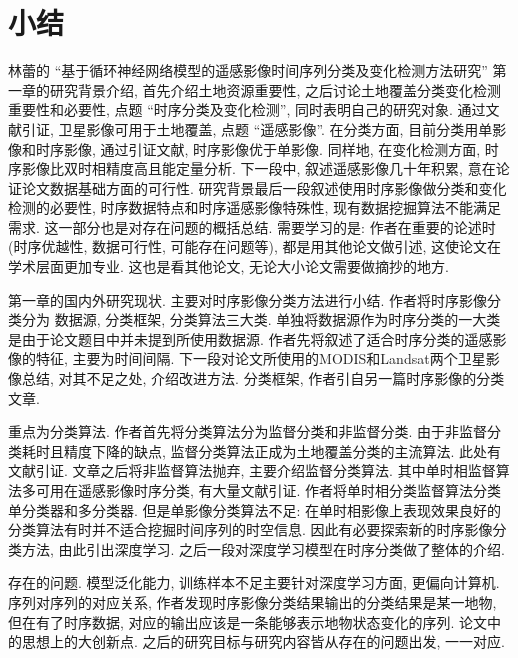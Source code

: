 \section{小结}
林蕾的 ``基于循环神经网络模型的遥感影像时间序列分类及变化检测方法研究'' 第一章的研究背景介绍, 首先介绍土地资源重要性, 之后讨论土地覆盖分类变化检测重要性和必要性, 点题 ``时序分类及变化检测'', 同时表明自己的研究对象. 通过文献引证, 卫星影像可用于土地覆盖, 点题 ``遥感影像''. 在分类方面, 目前分类用单影像和时序影像, 通过引证文献, 时序影像优于单影像. 同样地, 在变化检测方面, 时序影像比双时相精度高且能定量分析. 下一段中, 叙述遥感影像几十年积累, 意在论证论文数据基础方面的可行性. 研究背景最后一段叙述使用时序影像做分类和变化检测的必要性, 时序数据特点和时序遥感影像特殊性, 现有数据挖掘算法不能满足需求. 这一部分也是对存在问题的概括总结. 需要学习的是: 作者在重要的论述时(时序优越性, 数据可行性, 可能存在问题等), 都是用其他论文做引述, 这使论文在学术层面更加专业. 这也是看其他论文, 无论大小论文需要做摘抄的地方.

第一章的国内外研究现状. 主要对时序影像分类方法进行小结. 作者将时序影像分类分为 数据源, 分类框架, 分类算法三大类. 单独将数据源作为时序分类的一大类是由于论文题目中并未提到所使用数据源. 作者先将叙述了适合时序分类的遥感影像的特征, 主要为时间间隔. 下一段对论文所使用的MODIS和Landsat两个卫星影像总结, 对其不足之处, 介绍改进方法. 分类框架, 作者引自另一篇时序影像的分类文章.

重点为分类算法. 作者首先将分类算法分为监督分类和非监督分类. 由于非监督分类耗时且精度下降的缺点, 监督分类算法正成为土地覆盖分类的主流算法. 此处有文献引证. 文章之后将非监督算法抛弃, 主要介绍监督分类算法. 其中单时相监督算法多可用在遥感影像时序分类, 有大量文献引证. 作者将单时相分类监督算法分类单分类器和多分类器. 但是单影像分类算法不足: 在单时相影像上表现效果良好的分类算法有时并不适合挖掘时间序列的时空信息. 因此有必要探索新的时序影像分类方法, 由此引出深度学习. 之后一段对深度学习模型在时序分类做了整体的介绍. 

存在的问题. 模型泛化能力, 训练样本不足主要针对深度学习方面, 更偏向计算机. 序列对序列的对应关系, 作者发现时序影像分类结果输出的分类结果是某一地物, 但在有了时序数据, 对应的输出应该是一条能够表示地物状态变化的序列. 论文中的思想上的大创新点. 之后的研究目标与研究内容皆从存在的问题出发, 一一对应. 